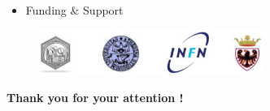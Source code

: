 \begin{frame}
\begin{itemize}
\item \textcolor{bellblue}{Funding} $\&$ \textcolor{bellblue}{Support}\\
\end{itemize}
\begin{figure}
\centering
\includegraphics[width=0.65\textwidth]{Figures/Logo_Support.jpg}
\end{figure}

\vspace{0em}
\begin{center}
{\Large \textcolor{bellblue}{\textbf{Thank you for your attention !}}}	 
\end{center}

\end{frame}

